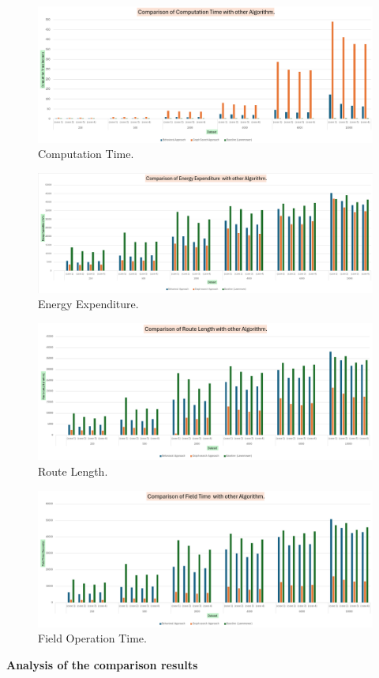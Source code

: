 \begin{figure}[H]
    \centering
    \includegraphics[width=\textwidth]{Images/plots/all/Computation_time.png}
    \caption{Computation Time.}
    \label{fig:Computation_time_all}
\end{figure}

\begin{figure}[H]
    \centering
    \includegraphics[width=\textwidth]{Images/plots/all/Energy.png}
    \caption{Energy Expenditure.}
    \label{fig:Energy_expenditure_all}
\end{figure}

\begin{figure}[H]
    \centering
    \includegraphics[width=\textwidth]{Images/plots/all/route_length.png}
    \caption{Route Length.}
    \label{fig:Route_length_all}
\end{figure}

\begin{figure}[H]
    \centering
    \includegraphics[width=\textwidth]{Images/plots/all/Field_time.png}
    \caption{Field Operation Time.}
    \label{fig:Field_operation_time_all}
\end{figure}


\textbf{Analysis of the comparison results}  


